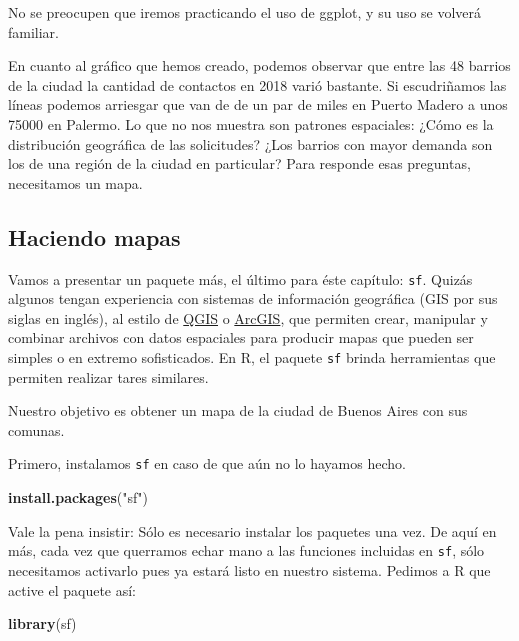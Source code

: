 \documentclass[]{book}
\newenvironment{Shaded}{\begin{snugshade}}{\end{snugshade}}
\newcommand{\KeywordTok}[1]{\textcolor[rgb]{0.13,0.29,0.53}{\textbf{#1}}}
\newcommand{\StringTok}[1]{\textcolor[rgb]{0.31,0.60,0.02}{#1}}
\newcommand{\NormalTok}[1]{#1}
\begin{document}
No se preocupen que iremos practicando el uso de ggplot, y su uso se
volverá familiar.

En cuanto al gráfico que hemos creado, podemos observar que entre las 48
barrios de la ciudad la cantidad de contactos en 2018 varió bastante. Si
escudriñamos las líneas podemos arriesgar que van de de un par de miles
en Puerto Madero a unos 75000 en Palermo. Lo que no nos muestra son
patrones espaciales: ¿Cómo es la distribución geográfica de las
solicitudes? ¿Los barrios con mayor demanda son los de una región de la
ciudad en particular? Para responde esas preguntas, necesitamos un mapa.

\subsection{Haciendo mapas}\label{haciendo-mapas}

Vamos a presentar un paquete más, el último para éste capítulo:
\texttt{sf}. Quizás algunos tengan experiencia con sistemas de
información geográfica (GIS por sus siglas en inglés), al estilo de
\href{https://qgis.org/en/site/}{QGIS} o
\href{https://www.arcgis.com/features/index.html}{ArcGIS}, que permiten
crear, manipular y combinar archivos con datos espaciales para producir
mapas que pueden ser simples o en extremo sofisticados. En R, el paquete
\texttt{sf} brinda herramientas que permiten realizar tares similares.

Nuestro objetivo es obtener un mapa de la ciudad de Buenos Aires con sus
comunas.

Primero, instalamos \texttt{sf} en caso de que aún no lo hayamos hecho.

\begin{Shaded}
\begin{Highlighting}[]
\KeywordTok{install.packages}\NormalTok{(}\StringTok{"sf"}\NormalTok{)}
\end{Highlighting}
\end{Shaded}

Vale la pena insistir: Sólo es necesario instalar los paquetes una vez.
De aquí en más, cada vez que querramos echar mano a las funciones
incluidas en \texttt{sf}, sólo necesitamos activarlo pues ya estará
listo en nuestro sistema. Pedimos a R que active el paquete así:

\begin{Shaded}
\begin{Highlighting}[]
\KeywordTok{library}\NormalTok{(sf)}
\end{Highlighting}
\end{Shaded}
\end{document}
